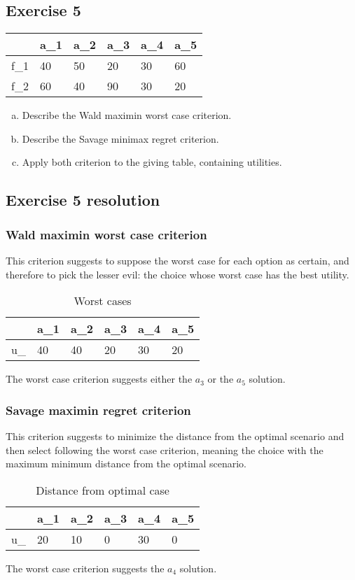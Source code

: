 \documentclass[\main/main.tex]{subfiles}
\begin{document}
\subsection{Exercise 5}

\begin{table}
  \begin{tabular}{L|LLLLL}
        & a_1 & a_2 & a_3 & a_4 & a_5 \\
    \hline
    f_1 & 40  & 50  & 20  & 30  & 60  \\
    f_2 & 60  & 40  & 90  & 30  & 20
  \end{tabular}
\end{table}

\begin{enumerate}[a)]
  \item Describe the Wald maximin worst case criterion.
  \item Describe the Savage minimax regret criterion.
  \item Apply both criterion to the giving table, containing utilities.
\end{enumerate}

\subsection{Exercise 5 resolution}
\subsubsection*{Wald maximin worst case criterion}
This criterion suggests to suppose the worst case for each option as certain, and therefore to pick the lesser evil: the choice whose worst case has the best utility.

\begin{table}
  \begin{tabular}{L|LLLLL}
                    & a_1 & a_2 & a_3 & a_4 & a_5 \\
    \hline
    u_{} & 40  & 40  & 20  & 30  & 20  \\
  \end{tabular}
  \caption{Worst cases}
\end{table}

The worst case criterion suggests either the $a_3$ or the $a_5$ solution.

\subsubsection*{Savage maximin regret criterion}
This criterion suggests to minimize the distance from the optimal scenario and then select following the worst case criterion, meaning the choice with the maximum minimum distance from the optimal scenario.

\begin{table}
  \begin{tabular}{L|LLLLL}
                      & a_1 & a_2 & a_3 & a_4 & a_5 \\
    \hline
    u_{} & 20  & 10  & 0   & 30  & 0   \\
  \end{tabular}
  \caption{Distance from optimal case}
\end{table}

The worst case criterion suggests the $a_4$ solution.
\end{document}
